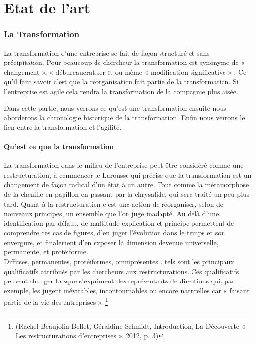 \documentclass[12pt,a4paper]{article}
\begin{document}
\newpage
\thispagestyle{empty}

\part{Etat de l'art}

\section{La Transformation}

La transformation d'une entreprise se fait de façon structuré et sans précipitation. Pour beaucoup de chercheur la transformation est synonyme de « changement », « débureaucratiser », ou même « modification significative » . Ce qu'il faut savoir c'est que la réorganisation fait partie de la transformation. Si l'entreprise est agile cela rendra la transformation de la compagnie plus aisée.

Dans cette partie, nous verrons ce qu'est une transformation ensuite nous aborderons la chronologie historique de la transformation. Enfin nous verrons le lien entre la transformation et l'agilité.


\subsection{Qu'est ce que la transformation}


La transformation dans le milieu de l'entreprise peut être considéré comme une restructuration, à commencer le Larousse qui précise que la transformation est un changement de façon radical d’un état à un autre. Tout comme la métamorphose de la chenille en papillon en passant par la chrysalide, qui sera traité un peu plus tard. Quant à la restructuration c'est une action de réorganiser, selon de nouveaux principes, un ensemble que l'on juge inadapté. Au delà d'une identification par défaut, de multitude explication et principe permettent de comprendre ces cas de figures, d'en juger l'évolution dans le temps et son envergure, et finalement d'en exposer la dimension devenue universelle, permanente, et protéiforme.\\


Diffuses, permanentes, protéiformes, omniprésentes… tels sont les principaux qualificatifs attribués par les chercheurs aux restructurations. Ces qualificatifs peuvent changer lorsque s’expriment des représentants de directions qui, par exemple, les jugent inévitables, incontournables ou encore naturelles car « faisant partie de la vie des entreprises ». \footnote{(Rachel Beaujolin-Bellet,  Géraldine Schmidt, Introduction, La Découverte « Les restructurations d’entreprises », 2012, p. 3)}\\
\end{document}
